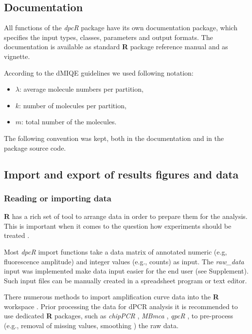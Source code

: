 \documentclass[a4,center,fleqn]{NAR}
\begin{document}
\subsection{Documentation}

All functions of the \textit{dpcR} package have its own documentation package, 
which specifies the input types, classes, parameters and output formats. The 
documentation is available as standard \textbf{R} package reference manual and 
as vignette.

According to the dMIQE guidelines \cite{huggett_digital_2013} we used following notation:

\begin{itemize}
 \item $\lambda$: average molecule numbers per partition,
 \item $k$: number of molecules per partition,
 \item $m$: total number of the molecules.
\end{itemize}

The following convention was kept, both in the documentation and in the 
package source code.

\subsection{Import and export of results figures and data}

\subsubsection{Reading or importing data}

\textbf{R} has a rich set of tool to arrange data in order to prepare them for 
the analysis. This is important when it comes to the question how experiments 
should be treated \citep{rodiger_r_2015}.

Most \textit{dpcR} import functions take a data matrix of annotated numeric 
(e.g, fluorescence amplitude) and integer values (e.g., counts) as input. The 
\textit{raw\_data} input was implemented  make data input easier for the end 
user (see Supplement). Such input files can be manually created in a spreadsheet 
program or text editor.

There numerous methods to import amplification curve data into the \textbf{R} 
workspace \cite{perkins_readqpcr_2012, pabinger_survey_2014, rodiger_r_2015}. 
Prior processing the data for dPCR analysis it is recommended to use dedicated 
\textbf{R} packages, such as \textit{chipPCR} \cite{roediger2015chippcr}, 
\textit{MBmca} \cite{rodiger_surface_2013}, \textit{qpcR} \cite{ritz_qpcr_2008}, 
to pre-process (e.g., removal of missing values, smoothing 
\cite{spiess_impact_2015}) the raw data.
\end{document}
